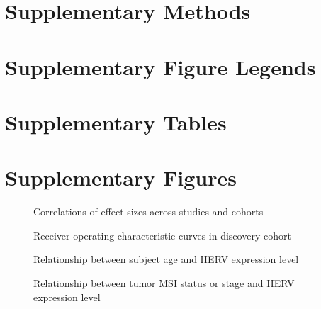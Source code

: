 \documentclass[11pt,letterpaper]{article}
\makeatletter
\renewcommand{\maketitle}{
        \begingroup
            \setlength{\parindent}{0pt}
            \begin{flushleft}
                \LARGE\textbf{\@title}
                \newline
                \newline
                \small\@author
            \end{flushleft}
        \endgroup
    }
\makeatother
\begin{document}
\maketitle

\newpage
\section*{Supplementary Methods}


\newpage



\newpage
\section*{Supplementary Figure Legends}


\newpage
\section*{Supplementary Tables}



\FloatBarrier
\newpage
\section*{Supplementary Figures}

\begin{figure}[ht]
  \caption{Correlations of effect sizes across studies and cohorts}
  \label{fig:corrs}
\end{figure}

\begin{figure}[ht]
  \caption{Receiver operating characteristic curves in discovery cohort}
  \label{fig:rocA}
\end{figure}

\begin{figure}[ht]
  \caption{Relationship between subject age and HERV expression level}
  \label{fig:age}
\end{figure}

\begin{figure}[ht]
  \caption{Relationship between tumor MSI status or stage and HERV expression level}
  \label{fig:msistage}
\end{figure}
\end{document}
